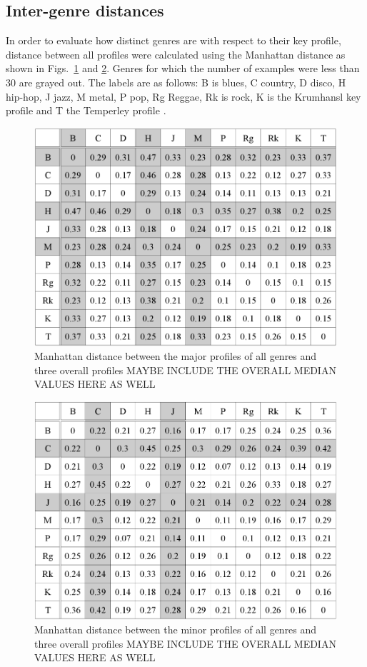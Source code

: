\documentclass{article}
\begin{document}
\subsection{Inter-genre distances}
In order to evaluate how distinct genres are with respect to their key profile, distance between all profiles were calculated using the Manhattan distance as shown in Figs.~\ref{fig:distance_major} and \ref{fig:distance_minor}. Genres for which the number of examples were less than 30 are grayed out. The labels are as follows: B is blues, C country, D disco, H hip-hop, J jazz, M metal, P pop, Rg Reggae, Rk is rock, K is the Krumhansl key profile and T the Temperley profile \cite{temperley_tonal_2007}.
\begin{figure}[tb]
    \includegraphics[scale=.4]{graph/majorDistManhattan}
	\caption{Manhattan distance between the major profiles of all genres and three overall profiles MAYBE INCLUDE THE OVERALL MEDIAN VALUES HERE AS WELL}
	\label{fig:distance_major}
\end{figure}
\begin{figure}[tb]
    \includegraphics[scale=.4]{graph/minorDistManhattan}
	\caption{Manhattan distance between the minor profiles of  all genres and three overall profiles MAYBE INCLUDE THE OVERALL MEDIAN VALUES HERE AS WELL}
	\label{fig:distance_minor}
\end{figure}
\end{document}
